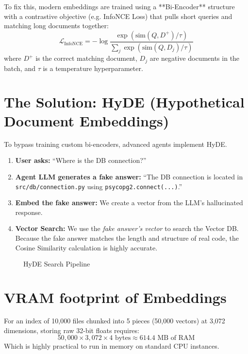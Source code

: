 To fix this, modern embeddings are trained using a **Bi-Encoder** structure with a contrastive objective (e.g. InfoNCE Loss) that pulls short queries and matching long documents together:
\begin{equation}
\mathcal{L}_{\text{InfoNCE}} = -\log \frac{\exp(\text{sim}(Q, D^+)/\tau)}{\sum_{j} \exp(\text{sim}(Q, D_j)/\tau)}
\end{equation}
where $D^+$ is the correct matching document, $D_j$ are negative documents in the batch, and $\tau$ is a temperature hyperparameter.

\section{The Solution: HyDE (Hypothetical Document Embeddings)}

To bypass training custom bi-encoders, advanced agents implement HyDE.

\begin{enumerate}
    \item \textbf{User asks:} ``Where is the DB connection?''
    \item \textbf{Agent LLM generates a fake answer:} ``The DB connection is located in \texttt{src/db/connection.py} using \texttt{psycopg2.connect(...)}.''
    \item \textbf{Embed the fake answer:} We create a vector from the LLM's hallucinated response.
    \item \textbf{Vector Search:} We use the \textit{fake answer's vector} to search the Vector DB. Because the fake answer matches the length and structure of real code, the Cosine Similarity calculation is highly accurate.
\end{enumerate}

\begin{figure}[h]
\centering
{}
\caption{HyDE Search Pipeline}
\end{figure}
\section{VRAM footprint of Embeddings}
For an index of 10,000 files chunked into 5 pieces (50,000 vectors) at 3,072 dimensions, storing raw 32-bit floats requires:
\begin{equation}
50,000 \times 3,072 \times 4 \text{ bytes} \approx 614.4 \text{ MB of RAM}
\end{equation}
Which is highly practical to run in memory on standard CPU instances.
